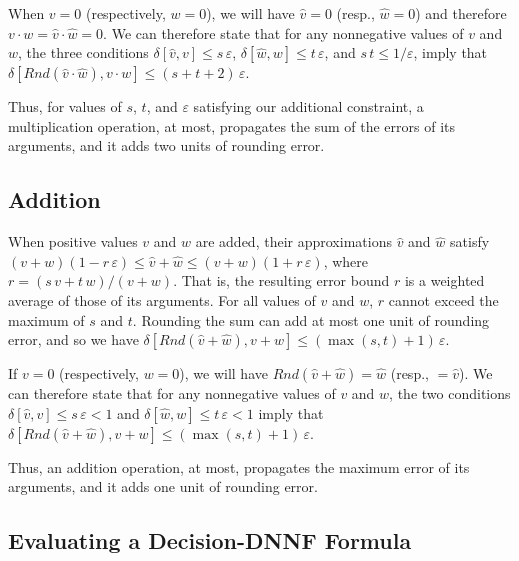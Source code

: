 \documentclass[letterpaper,USenglish,cleveref, autoref, thm-restate]{lipics-v2021}
\newcommand{\approximate}[1]{\hat{#1}}
\newcommand{\approxv}{\approximate{v}}
\newcommand{\approxw}{\approximate{w}}
\newcommand{\round}{\mathit{Rnd}}
\newcommand{\aerror}{\delta}
\newcommand{\roundepsilon}{\varepsilon}
\begin{document}
When $v=0$ (respectively, $w=0$), we will have $\approxv=0$ (resp., $\approxw = 0$) and therefore $v \cdot w = \approxv \cdot \approxw = 0$.
We can therefore state that  for any nonnegative values of $v$ and $w$, the three conditions $\aerror[\approxv, v] \leq s\,\roundepsilon$,
$\aerror[\approxw, w] \leq t\,\roundepsilon$, and
$s\,t \leq 1/\roundepsilon$, imply that
$\aerror[\round(\approxv \cdot \approxw), v \cdot w] \leq (s+t+2)\,\roundepsilon$.

Thus, for values of $s$, $t$, and $\roundepsilon$ satisfying our
additional constraint, a multiplication operation, at most, propagates
the sum of the errors of its arguments, and it adds two units of
rounding error.

\subsection{Addition}

When positive values $v$ and $w$ are added, their approximations  $\approxv$ and $\approxw$ satisfy
$(v + w) (1 - r\,\roundepsilon) \leq \approxv + \approxw \leq (v + w) (1 + r\,\roundepsilon)$, where
$r = (s\,v + t\,w)/(v+w)$.
That is, the resulting error bound $r$ is a weighted average
of those of its arguments.  For all values of $v$ and $w$, $r$ cannot exceed the maximum of $s$ and $t$.
Rounding the sum can add at most one unit of rounding error, and so we have
$\aerror[\round(\approxv + \approxw), v + w] \leq (\max(s,t)+1)\,\roundepsilon$.

If $v = 0$ (respectively, $w = 0$), we will have $\round(\approxv + \approxw) = \approxw$ (resp., $= \approxv$).
We can therefore state that for any nonnegative values of $v$ and $w$, the two conditions $\aerror[\approxv, v] \leq s\,\roundepsilon < 1$ and
$\aerror[\approxw, w] \leq t\,\roundepsilon < 1$ imply that 
$\aerror[\round(\approxv + \approxw), v + w] \leq (\max(s,t)+1)\,\roundepsilon$.

Thus, an addition operation, at most, propagates the maximum error of its arguments, and it adds one unit of rounding error.

\subsection{Evaluating a Decision-DNNF Formula}
\label{sect:error:formula}
\end{document}
